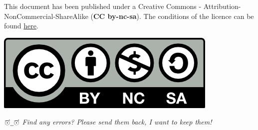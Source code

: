 \documentclass[a4paper, 10pt]{article}
\begin{document}

\begin{shaded}
This document has been published under a Creative Commons - Attribution-NonCommercial-ShareAlike (\textbf{CC by-nc-sa}). The conditions of the licence can be found \href{http://creativecommons.org/licenses/by-nc-sa/3.0/}{here}. \\
\centerline{\href{http://creativecommons.org/licenses/by-nc-sa/3.0/}{\includegraphics[scale=1]{../cc-by-nc-sa.png} } }
\end{shaded}

\textit{\ensuremath{\overset{-\mkern-11mu-\mkern-3.5mu\rhook}{\smash{\odot}\rule{0ex}{.46ex}}\underline{\hspace{0.5em}}\overset{-\mkern-11mu-\mkern-3.5mu\rhook}{\smash{\odot}\rule{0ex}{.46ex}}}
Find any errors? Please send them back, I want to keep them!}


\end{document}
